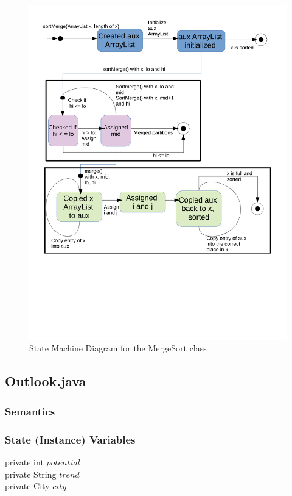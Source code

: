 \documentclass[12pt,fleqn]{article}
\begin{document}
\begin{figure}[hp!]
\caption{State Machine Diagram for the MergeSort class}
 \includegraphics[width =\linewidth]{statediagram_maergesort.pdf}
\end{figure}

\newpage
\subsection*{Outlook.java}\label{poutlook}

\subsubsection*{Semantics}
\subsubsection*{State (Instance) Variables}
	private int $potential$\\
	private String $trend$\\
	private City $city$\\
\end{document}
